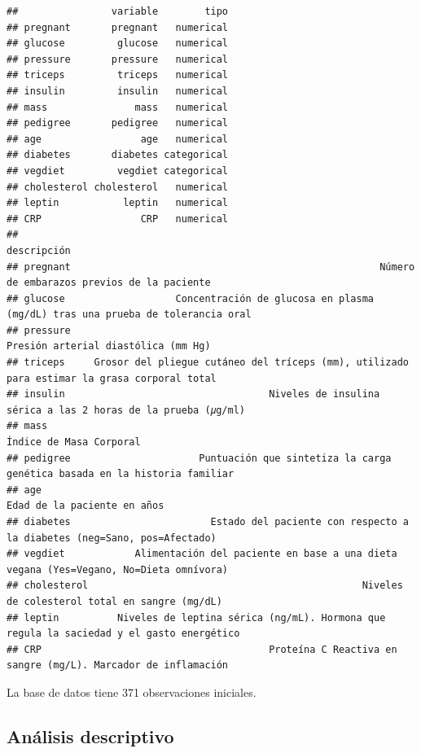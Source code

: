 \documentclass[
]{article}
\begin{document}
\begin{verbatim}
##                variable        tipo
## pregnant       pregnant   numerical
## glucose         glucose   numerical
## pressure       pressure   numerical
## triceps         triceps   numerical
## insulin         insulin   numerical
## mass               mass   numerical
## pedigree       pedigree   numerical
## age                 age   numerical
## diabetes       diabetes categorical
## vegdiet         vegdiet categorical
## cholesterol cholesterol   numerical
## leptin           leptin   numerical
## CRP                 CRP   numerical
##                                                                                             descripción
## pregnant                                                     Número de embarazos previos de la paciente
## glucose                   Concentración de glucosa en plasma (mg/dL) tras una prueba de tolerancia oral
## pressure                                                            Presión arterial diastólica (mm Hg)
## triceps     Grosor del pliegue cutáneo del tríceps (mm), utilizado para estimar la grasa corporal total
## insulin                                   Niveles de insulina sérica a las 2 horas de la prueba (𝜇g/ml)
## mass                                                                            Índice de Masa Corporal
## pedigree                      Puntuación que sintetiza la carga genética basada en la historia familiar
## age                                                                         Edad de la paciente en años
## diabetes                        Estado del paciente con respecto a la diabetes (neg=Sano, pos=Afectado)
## vegdiet            Alimentación del paciente en base a una dieta vegana (Yes=Vegano, No=Dieta omnívora)
## cholesterol                                               Niveles de colesterol total en sangre (mg/dL)
## leptin          Niveles de leptina sérica (ng/mL). Hormona que regula la saciedad y el gasto energético
## CRP                                       Proteína C Reactiva en sangre (mg/L). Marcador de inflamación
\end{verbatim}

La base de datos tiene 371 observaciones iniciales.

\subsection{Análisis descriptivo}\label{anuxe1lisis-descriptivo}
\end{document}
